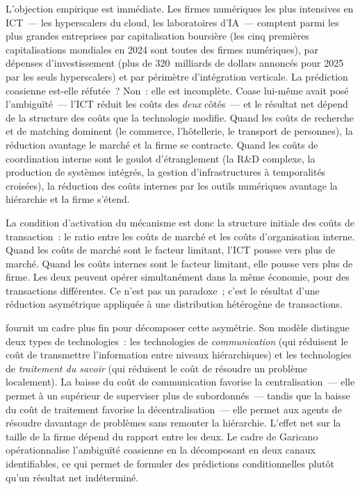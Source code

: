 L'objection empirique est immédiate. Les firmes numériques les plus intensives en ICT~--- les hyperscalers du cloud, les laboratoires d'IA~--- comptent parmi les plus grandes entreprises par capitalisation boursière (les cinq premières capitalisations mondiales en 2024 sont toutes des firmes numériques), par dépenses d'investissement (plus de 320~milliards de dollars annoncés pour 2025 par les seuls hyperscalers) et par périmètre d'intégration verticale. La prédiction coasienne est-elle réfutée~? Non~: elle est incomplète. Coase lui-même avait posé l'ambiguïté~--- l'ICT réduit les coûts des \emph{deux} côtés~--- et le résultat net dépend de la structure des coûts que la technologie modifie. Quand les coûts de recherche et de matching dominent (le commerce, l'hôtellerie, le transport de personnes), la réduction avantage le marché et la firme se contracte. Quand les coûts de coordination interne sont le goulot d'étranglement (la R\&D complexe, la production de systèmes intégrés, la gestion d'infrastructures à temporalités croisées), la réduction des coûts internes par les outils numériques avantage la hiérarchie et la firme s'étend.

La condition d'activation du mécanisme est donc la structure initiale des coûts de transaction~: le ratio entre les coûts de marché et les coûts d'organisation interne. Quand les coûts de marché sont le facteur limitant, l'ICT pousse vers plus de marché. Quand les coûts internes sont le facteur limitant, elle pousse vers plus de firme. Les deux peuvent opérer simultanément dans la même économie, pour des transactions différentes. Ce n'est pas un paradoxe~; c'est le résultat d'une réduction asymétrique appliquée à une distribution hétérogène de transactions.

\textcite{garicano_hierarchies_2000} fournit un cadre plus fin pour décomposer cette asymétrie. Son modèle distingue deux types de technologies~: les technologies de \emph{communication} (qui réduisent le coût de transmettre l'information entre niveaux hiérarchiques) et les technologies de \emph{traitement du savoir} (qui réduisent le coût de résoudre un problème localement). La baisse du coût de communication favorise la centralisation~--- elle permet à un supérieur de superviser plus de subordonnés~--- tandis que la baisse du coût de traitement favorise la décentralisation~--- elle permet aux agents de résoudre davantage de problèmes sans remonter la hiérarchie. L'effet net sur la taille de la firme dépend du rapport entre les deux. Le cadre de Garicano opérationnalise l'ambiguïté coasienne en la décomposant en deux canaux identifiables, ce qui permet de formuler des prédictions conditionnelles plutôt qu'un résultat net indéterminé.


